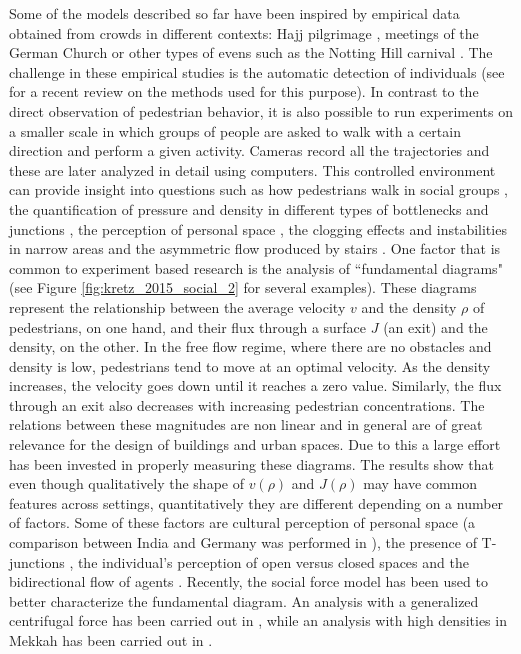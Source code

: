Some of the models described so far have been inspired by empirical data obtained from crowds in different contexts: Hajj pilgrimage \cite{helbing_2007_dynamics,johansson_2008_crowd}, meetings of the German Church \cite{schultz_2014_group} or other types of evens such as the Notting Hill carnival \cite{batty_2003_safety}. The challenge in these empirical studies is the automatic detection of individuals (see \cite{benenson_2014_ten} for a recent review on the methods used for this purpose). 
%
In contrast to the direct observation of pedestrian behavior, it is also possible to run experiments on a smaller scale in which groups of people are asked to walk with a certain direction and perform a given activity. Cameras record all the trajectories and these are later analyzed in detail using computers. This controlled environment can provide insight into questions such as how pedestrians walk in social groups \cite{moussaid_2010_walking}, the quantification of pressure and density in different types of bottlenecks and junctions \cite{zhang_2014_quantification}, the perception of personal space \cite{ducourant_2005_timing}, the clogging effects and instabilities in narrow areas \cite{moussaid_2012_traffic,bukacek_2014_experimental} and the asymmetric flow produced by stairs \cite{corbetta_2015_asymmetric}. 
%
One factor that is common to experiment based research is the analysis of ``fundamental diagrams" \cite{jelic_2012_properties} (see Figure \ref{fig:kretz_2015_social_2} for several examples). These diagrams represent the relationship between the average velocity $v$ and the density $\rho$ of pedestrians, on one hand, and their flux through a surface  $J$ (an exit) and the density, on the other. 
%
In the free flow regime, where there are no obstacles and density is low, pedestrians tend to move at an optimal velocity. As the density increases, the velocity goes down until it reaches a zero value. Similarly, the flux through an exit also decreases with increasing pedestrian concentrations. The relations between these magnitudes are non linear and in general are of great relevance for the design of buildings and urban spaces. Due to this a large effort has been invested in properly measuring these diagrams. 
%
The results show that even though qualitatively the shape of $v(\rho)$ and $J(\rho)$ may have common features across settings, quantitatively they are different depending on a number of factors. Some of these factors are cultural perception of personal space (a comparison between India and Germany was performed in \cite{chattaraj_2009_comparison}), the presence of T-junctions \cite{zhang_2013_experimental}, the individual's perception of open versus closed spaces \cite{zhang_2014_effects} and the bidirectional flow of agents \cite{zhang_2014_comparison}. Recently, the social force model has been used to better characterize the fundamental diagram. An analysis with a generalized centrifugal force has been carried out in \cite{chraibi_2010_generalized}, while an analysis with high densities in Mekkah has been carried out in \cite{dridi_2015_simulation}. 

